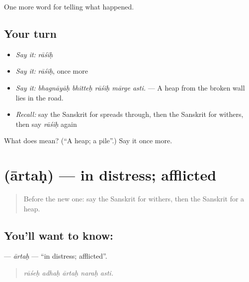 \begin{grammarlens}[title={What you've built}]
One more word for telling what happened.
\end{grammarlens}

\subsection*{Your turn}
\begin{itemize}
\raggedright
  \item \emph{Say it:} \emph{rāśiḥ}
  \item \emph{Say it:} \emph{rāśiḥ}, once more
  \item \emph{Say it:} \emph{bhagnāyāḥ bhitteḥ rāśiḥ mārge asti.} — A heap from the broken wall lies in the road.
  \item \emph{Recall:} say the Sanskrit for spreads through, then the Sanskrit for withers, then say \emph{rāśiḥ} again
\end{itemize}

\begin{tcolorbox}[breakable,colback=teal!4,colframe=teal!35!black,title={Before you move on}]
What does  mean? (\textquotedblleft{}A heap; a pile\textquotedblright{}.) Say it once more.
\end{tcolorbox}
\section[\texorpdfstring{\sk{आर्तः} (ārtaḥ)}{आर्तः (ārtaḥ)}]{ (ārtaḥ) — in distress; afflicted}

\label{lesson:SA-C304-artah}



\begin{quote}
Before the new one: say the Sanskrit for withers, then the Sanskrit for a heap.
\end{quote}

\subsection*{You'll want to know: }
\textbf{} — \emph{ārtaḥ} — \textquotedblleft{}in distress; afflicted\textquotedblright{}.

\begin{quote}
    
\end{quote}

\begin{quote}
\emph{rāśeḥ adhaḥ ārtaḥ naraḥ asti.}
\end{quote}

